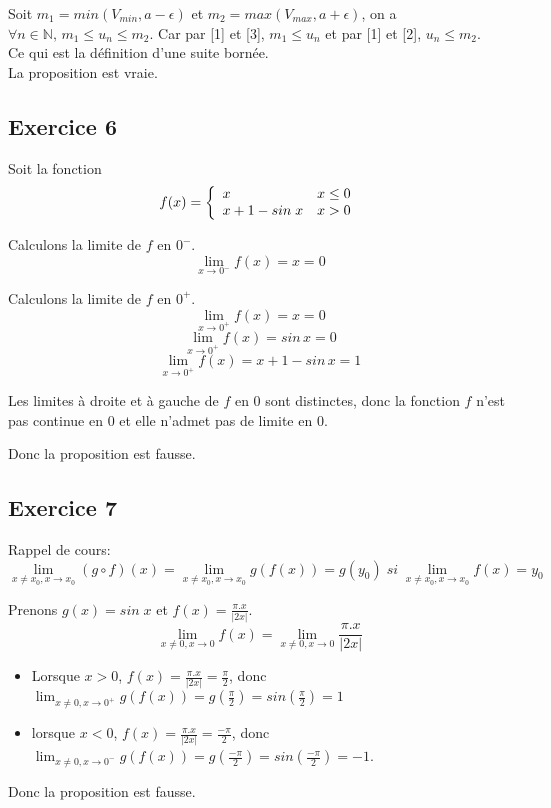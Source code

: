 \documentclass[]{book}
\theoremstyle{definition}
\newcommand{\bb}[1]{\mathbb{#1}}
\newcommand{\N}{\bb{N}}
\begin{document}
Soit $m_1 = min(V_{min}, a-\epsilon)$ et $m_2=max(V_{max}, a+\epsilon)$, on a $\forall n \in \N,\, m_1 \le u_n \le m_2$. Car par [1] et [3], $m_1 \le u_n$ et par [1] et [2], $u_n \le m_2$.  \\
Ce qui est la d\'efinition d'une suite born\'ee.\\


La proposition est vraie.


\subsection*{Exercice 6}
Soit la fonction 
$$f(x) = 
\left\{ 
\begin{array}{l l}
 x &  x \le 0\\
 x+1-sin\; x & x > 0\\
\end{array}
\right. 
$$

Calculons la limite de $f$ en $0^-$.
$$\lim_{x \to 0^-} f(x) = x = 0$$

Calculons la limite de $f$ en $0^+$.
$$\lim_{x \to 0^+} f(x) = x = 0$$
$$\lim_{x \to 0^+} f(x) = sin\, x = 0$$
$$\lim_{x \to 0^+} f(x) = x +1 - sin\, x = 1$$


Les limites \`a droite et \`a gauche de $f$ en $0$ sont distinctes, donc la fonction $f$ n'est pas continue en $0$ et elle n'admet pas de limite en $0$.

Donc la proposition est fausse.


\subsection*{Exercice 7}
Rappel de cours:
$$\lim_{x \neq x_0, x \to x_0}(g \circ f)(x) = \lim_{x \neq x_0, x \to x_0}g(f(x)) = g(y_0)\; si\; \lim_{x \neq x_0, x \to x_0} f(x) = y_0 $$

Prenons $g(x) = sin\; x$ et $f(x) = \frac{\pi.x}{|2x|}$. 
$$ \lim_{x \neq 0, x \to 0} f(x) = \lim_{x \neq 0, x \to 0} \frac{\pi.x}{|2x|}$$
\begin{itemize}
\item Lorsque $x>0$, $f(x) = \frac{\pi.x}{|2x|} = \frac{\pi}{2}$, donc $\lim_{x \neq 0, x \to 0^{+}} g(f(x)) = g(\frac{\pi}{2}) = sin(\frac{\pi}{2}) = 1$ 
\item lorsque $x<0$, $f(x) = \frac{\pi.x}{|2x|} = \frac{-\pi}{2}$, donc $\lim_{x \neq 0, x \to 0^{-}} g(f(x)) = g(\frac{-\pi}{2}) = sin(\frac{-\pi}{2}) = -1$.
\end{itemize}


Donc la proposition est fausse.
\end{document}
